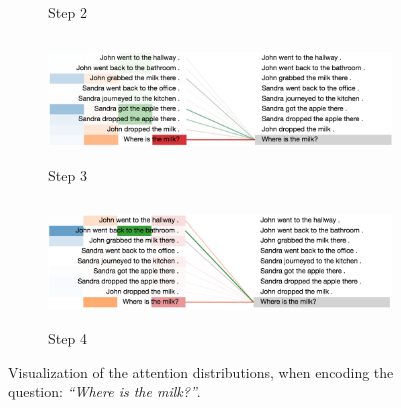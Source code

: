 \begin{figure}[!h]
\begin{minipage}{\textwidth}
\begin{subfigure}[t]{\textwidth}
        \caption{Step 2}
    \end{subfigure}
    \hfill \hfill
    \begin{subfigure}[t]{\textwidth}
        \centering
        \includegraphics[height=1.3in]{04-part-03/chapter-06/figs_and_tables/figs_attention_babi/e3-step3}
        \caption{Step 3}
    \end{subfigure}
    \hfill \hfill 
    \begin{subfigure}[t]{\textwidth}
        \centering
        \includegraphics[height=1.3in]{04-part-03/chapter-06/figs_and_tables/figs_attention_babi/e3-step4}
        \caption{Step 4}
    \end{subfigure}
    \end{minipage}
    \caption{\label{fig:ex3}Visualization of the attention distributions, when encoding the question: \emph{``Where is the milk?''}.}
\end{figure}

\afterpage{\clearpage}

